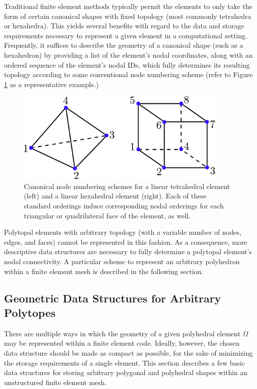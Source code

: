 	Traditional finite element methods typically permit the elements to only take the form of certain canonical shapes with fixed topology (most commonly tetrahedra or hexahedra). This yields several benefits with regard to the data and storage requirements necessary to represent a given element in a computational setting. Frequently, it suffices to describe the geometry of a canonical shape (such as a hexahedron) by providing a list of the element's nodal coordinates, along with an ordered sequence of the element's nodal IDs, which fully determines its resulting topology according to some conventional node numbering scheme (refer to Figure \ref{fig:canonical_orderings} as a representative example.)
	\begin{figure} [!ht]
		\centering
		\includegraphics[width = 4.0in]{figures/canonical_orderings.pdf}
		\caption{Canonical node numbering schemes for a linear tetrahedral element (left) and a linear hexahedral element (right). Each of these standard orderings induce corresponding nodal orderings for each triangular or quadrilateral face of the element, as well.}
		\label{fig:canonical_orderings}
	\end{figure}
	
	Polytopal elements with arbitrary topology (with a variable number of nodes, edges, and faces) cannot be represented in this fashion. As a consequence, more descriptive data structures are necessary to fully determine a polytopal element's nodal connectivity. A particular scheme to represent an arbitrary polyhedron within a finite element mesh is described in the following section.

\subsection*{Geometric Data Structures for Arbitrary Polytopes}

	There are multiple ways in which the geometry of a given polyhedral element $\Omega$ may be represented within a finite element code. Ideally, however, the chosen data structure should be made as compact as possible, for the sake of minimizing the storage requirements of a single element. This section describes a few basic data structures for storing arbitrary polygonal and polyhedral shapes within an unstructured finite element mesh.
	
